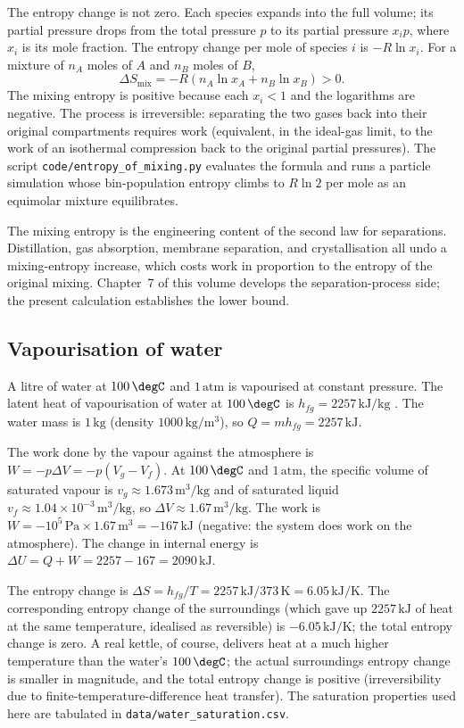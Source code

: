 The entropy change is not zero. Each species expands into the full
volume; its partial pressure drops from the total pressure $p$ to its
partial pressure $x_i p$, where $x_i$ is its mole fraction. The
entropy change per mole of species $i$ is $-R \ln x_i$. For a mixture
of $n_A$ moles of $A$ and $n_B$ moles of $B$,
\[
\Delta S_{\text{mix}} = -R(n_A \ln x_A + n_B \ln x_B) > 0.
\]
The mixing entropy is positive because each $x_i < 1$ and the
logarithms are negative. The process is irreversible: separating the
two gases back into their original compartments requires work
(equivalent, in the ideal-gas limit, to the work of an isothermal
compression back to the original partial pressures). The script
\texttt{code/entropy\_of\_mixing.py} evaluates the formula and runs a
particle simulation whose bin-population entropy climbs to $R \ln 2$
per mole as an equimolar mixture equilibrates.

The mixing entropy is the engineering content of the second law for
separations. Distillation, gas absorption, membrane separation, and
crystallisation all undo a mixing-entropy increase, which costs work
in proportion to the entropy of the original mixing. Chapter~7 of
this volume develops the separation-process side; the present
calculation establishes the lower bound.

\subsection{Vapourisation of water}

A litre of water at $100\,\degC$ and $1\,\text{atm}$ is vapourised at
constant pressure. The latent heat of vapourisation of water at
$100\,\degC$ is $h_{fg} = 2257\,\text{kJ}/\text{kg}$ \cite[Table A-4]{
text:cengel-boles}. The water mass is $1\,\text{kg}$ (density
$1000\,\text{kg}/\text{m}^3$), so $Q = m h_{fg} = 2257\,\text{kJ}$.

The work done by the vapour against the atmosphere is $W = -p \Delta V
= -p(V_g - V_f)$. At $100\,\degC$ and $1\,\text{atm}$, the specific
volume of saturated vapour is $v_g \approx 1.673\,\text{m}^3/
\text{kg}$ and of saturated liquid $v_f \approx 1.04 \times
10^{-3}\,\text{m}^3/\text{kg}$, so $\Delta V \approx 1.67\,\text{m}^3
/\text{kg}$. The work is $W = -10^5 \,\text{Pa} \times 1.67\,
\text{m}^3 = -167\,\text{kJ}$ (negative: the system does work on the
atmosphere). The change in internal energy is $\Delta U = Q + W = 2257
- 167 = 2090\,\text{kJ}$.

The entropy change is $\Delta S = h_{fg}/T = 2257\,\text{kJ}/373\,
\si{\kelvin} = 6.05\,\text{kJ}/\text{K}$. The corresponding entropy
change of the surroundings (which gave up $2257\,\text{kJ}$ of heat at
the same temperature, idealised as reversible) is $-6.05\,\text{kJ}/
\text{K}$; the total entropy change is zero. A real kettle, of course,
delivers heat at a much higher temperature than the water's
$100\,\degC$; the actual surroundings entropy change is smaller in
magnitude, and the total entropy change is positive (irreversibility
due to finite-temperature-difference heat transfer). The saturation
properties used here are tabulated in
\texttt{data/water\_saturation.csv}.

